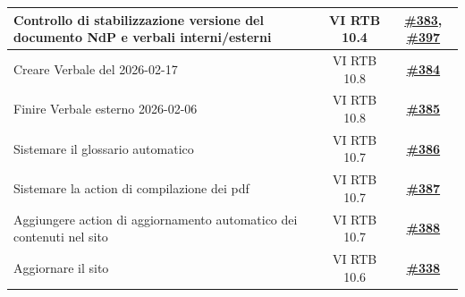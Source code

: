 \documentclass[a4paper,12pt]{article}
\newcommand{\ignoreglossary}{}
\begin{document}
\begin{longtable}{|>{\raggedright\arraybackslash}p{}|c|c|}
\hline
\rowcolor{white}
Controllo di stabilizzazione versione del documento NdP e verbali interni/esterni & VI \ignoreglossary{RTB} 10.4 & \href{https://github.com/SWE-BitByBit/SWE-docs/issues/383}{\textbf{\#383}}, \href{https://github.com/SWE-BitByBit/SWE-docs/issues/397}{\textbf{\#397}} \\
\hline
\rowcolor{gray!20}
Creare Verbale del 2026-02-17 & VI \ignoreglossary{RTB} 10.8 & \href{https://github.com/SWE-BitByBit/SWE-docs/issues/384}{\textbf{\#384}} \\
\hline
\rowcolor{white}
Finire Verbale esterno 2026-02-06 & VI \ignoreglossary{RTB} 10.8 & \href{https://github.com/SWE-BitByBit/SWE-docs/issues/385}{\textbf{\#385}} \\
\hline
\rowcolor{gray!20}
Sistemare il glossario automatico & VI \ignoreglossary{RTB} 10.7 & \href{https://github.com/SWE-BitByBit/SWE-docs/issues/386}{\textbf{\#386}} \\
\hline
\rowcolor{white}
Sistemare la action di compilazione dei pdf & VI \ignoreglossary{RTB} 10.7 & \href{https://github.com/SWE-BitByBit/SWE-docs/issues/387}{\textbf{\#387}} \\
\hline
\rowcolor{gray!20}
Aggiungere action di aggiornamento automatico dei contenuti nel sito & VI \ignoreglossary{RTB} 10.7 & \href{https://github.com/SWE-BitByBit/SWE-docs/issues/388}{\textbf{\#388}} \\
\hline
\rowcolor{white}
Aggiornare il sito & VI \ignoreglossary{RTB} 10.6 & \href{https://github.com/SWE-BitByBit/SWE-docs/issues/338}{\textbf{\#338}} \\
\hline
\end{longtable}
\normalsize
\end{document}
